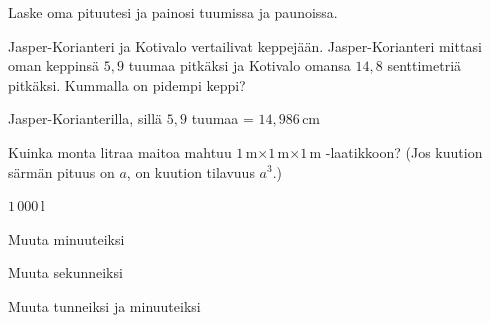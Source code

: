 \begin{tehtavasivu}
\begin{tehtava}
Laske oma pituutesi ja painosi tuumissa ja paunoissa. %
\end{tehtava}

\begin{tehtava}
Jasper-Korianteri ja Kotivalo vertailivat keppejään. Jasper-Korianteri mittasi oman keppinsä $5,9$ tuumaa pitkäksi ja Kotivalo omansa $14,8$ senttimetriä pitkäksi. Kummalla on pidempi keppi?
\begin{vastaus}
Jasper-Korianterilla, sillä $5,9$ tuumaa = $14,986$\,cm
\end{vastaus}
\end{tehtava}

\begin{tehtava}
Kuinka monta litraa maitoa mahtuu $1$\,m$\times 1$\,m$\times 1$\,m -laatikkoon? (Jos kuution särmän pituus on $a$, on kuution tilavuus $a^3$.)
	\begin{vastaus}
	$1\,000$\,l
	\end{vastaus}
\end{tehtava}

\begin{tehtava}
Muuta minuuteiksi
\begin{vastaus}
\end{vastaus}
\end{tehtava}

\begin{tehtava}
Muuta sekunneiksi
\begin{vastaus}
\end{vastaus}
\end{tehtava}

\begin{tehtava}
Muuta tunneiksi ja minuuteiksi
\begin{vastaus}
\end{vastaus}
\end{tehtava}


\end{tehtavasivu}
